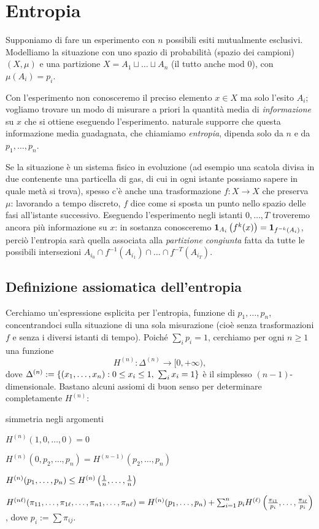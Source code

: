 \section{Entropia}

Supponiamo di fare un esperimento con $n$ possibili esiti mutualmente esclusivi.
Modelliamo la situazione con uno spazio di probabilità (spazio dei campioni) $(X,\mu)$
e una partizione $X=A_1\sqcup \dots\sqcup A_n$ (il tutto anche mod $0$), con $\mu(A_i)=p_i$. 

Con l'esperimento non conosceremo il preciso elemento $x\in X$ ma solo l'esito $A_i$; vogliamo
trovare un modo di misurare a priori la quantità media di \emph{informazione} su $x$ che si ottiene eseguendo l'esperimento. 
\Eacc naturale supporre che questa informazione media guadagnata, che chiamiamo \emph{entropia}, dipenda solo da $n$ e da $p_1,\dots,p_n$.

Se la situazione è un sistema fisico in evoluzione (ad esempio una scatola divisa in due contenente una particella di gas, di cui
in ogni istante possiamo sapere in quale metà si trova), spesso c'è anche una trasformazione $f:X\to X$
che preserva $\mu$: lavorando a tempo discreto, $f$ dice come si sposta un punto nello spazio delle fasi
all'istante successivo. Eseguendo l'esperimento negli istanti $0,\dots,T$ troveremo ancora più informazione su $x$:
in sostanza conosceremo $\bm{1}_{A_i}\left(f^k(x)\right)=\bm{1}_{f^{-k}(A_i)}$, perciò l'entropia sarà quella associata
alla \emph{partizione congiunta} fatta da tutte le possibili intersezioni $A_{i_0}\cap f^{-1}(A_{i_1})\cap \dots\cap f^{-T}(A_{i_T})$.

\subsection{Definizione assiomatica dell'entropia}
Cerchiamo un'espressione esplicita per l'entropia, funzione di $p_1,\dots,p_n$, concentrandoci sulla situazione di una sola misurazione
(cioè senza trasformazioni $f$ e senza i diversi istanti di tempo).
Poiché $\sum_i p_i=1$, cerchiamo per ogni $n\ge 1$ una funzione
\[ H^{(n)}:\Delta^{(n)}\to [0,+\infty), \]
dove $\Delta^{(n)}:=\left\{(x_1,\dots,x_n):0\le x_i\le 1,\ \sum_i x_i=1\right\}$ è il simplesso $(n-1)$-dimensionale. Bastano alcuni assiomi di buon senso per determinare completamente $H^{(n)}$:
\begin{lista}
\item simmetria negli argomenti
\item $H^{(n)}(1,0,\dots,0)=0$
\item $H^{(n)}(0,p_2,\dots,p_n)=H^{(n-1)}(p_2,\dots,p_n)$
\item $H^{(n)}(p_1,\dots,p_n)\le H^{(n)}\left(\frac{1}{n},\dots,\frac{1}{n}\right)$
\item $H^{(n\ell)}(\pi_{11},\dots,\pi_{1\ell},\dots,\pi_{n1},\dots,\pi_{n\ell})=H^{(n)}(p_1,\dots,p_n)
+\sum_{i=1}^n p_i H^{(\ell)}\left(\frac{\pi_{i1}}{p_i},\dots,\frac{\pi_{i\ell}}{p_i}\right)$, dove $p_i:=\sum \pi_{ij}$.
\end{lista}

